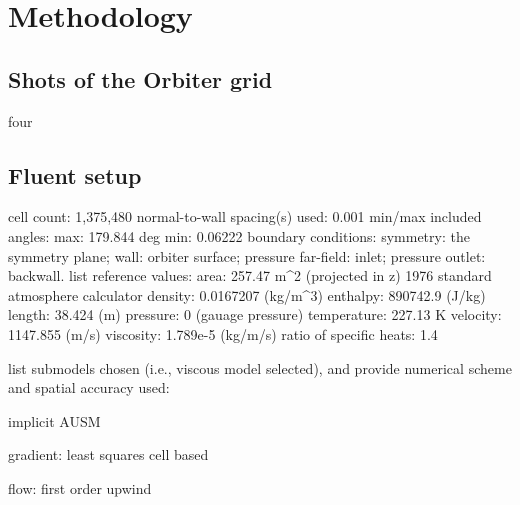 \section{Methodology}

\subsection{Shots of the Orbiter grid}

four

\subsection{Fluent setup}

cell count: 1,375,480
normal-to-wall spacing(s) used: 0.001
min/max included angles: max: 179.844 deg min: 0.06222
boundary conditions: symmetry: the symmetry plane; wall: orbiter surface; pressure far-field: inlet; pressure outlet: backwall.
list reference values:
area: 257.47 m^2 (projected in z) 1976 standard atmosphere calculator
density: 0.0167207 (kg/m^3)
enthalpy: 890742.9 (J/kg)
length: 38.424 (m)
pressure: 0 (gauage pressure)
temperature: 227.13 K
velocity: 1147.855 (m/s)
viscosity: 1.789e-5 (kg/m/s)
ratio of specific heats: 1.4

list submodels chosen (i.e., viscous model selected), and provide numerical scheme and spatial accuracy used:

implicit AUSM

gradient: least squares cell based

flow: first order upwind
